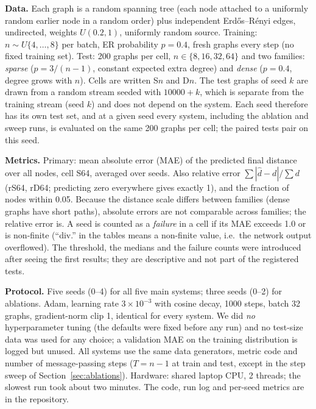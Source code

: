 \textbf{Data.} Each graph is a random spanning tree (each node attached to a uniformly random earlier node in a random order) plus independent Erd\H{o}s--R\'enyi edges, undirected, weights $U(0.2,1)$, uniformly random source. Training: $n\sim U\{4,\dots,8\}$ per batch, ER probability $p=0.4$, fresh graphs every step (no fixed training set). Test: 200 graphs per cell, $n\in\{8,16,32,64\}$ and two families: \emph{sparse} ($p=3/(n-1)$, constant expected extra degree) and \emph{dense} ($p=0.4$, degree grows with $n$). Cells are written S$n$ and D$n$. The test graphs of seed $k$ are drawn from a random stream seeded with $10000+k$, which is separate from the training stream (seed $k$) and does not depend on the system. Each seed therefore has its own test set, and at a given seed every system, including the ablation and sweep runs, is evaluated on the same 200 graphs per cell; the paired tests pair on this seed.

\textbf{Metrics.} Primary: mean absolute error (MAE) of the predicted final distance over all nodes, cell S64, averaged over seeds. Also relative error $\sum|\hat d-d|/\sum d$ (rS64, rD64; predicting zero everywhere gives exactly 1), and the fraction of nodes within 0.05. Because the distance scale differs between families (dense graphs have short paths), absolute errors are not comparable across families; the relative error is. A seed is counted as a \emph{failure} in a cell if its MAE exceeds 1.0 or is non-finite (``div.'' in the tables means a non-finite value, i.e.\ the network output overflowed). The threshold, the medians and the failure counts were introduced after seeing the first results; they are descriptive and not part of the registered tests.

\textbf{Protocol.} Five seeds (0--4) for all five main systems; three seeds (0--2) for ablations. Adam, learning rate $3\times10^{-3}$ with cosine decay, 1000 steps, batch 32 graphs, gradient-norm clip 1, identical for every system. We did \emph{no} hyperparameter tuning (the defaults were fixed before any run) and no test-size data was used for any choice; a validation MAE on the training distribution is logged but unused. All systems use the same data generators, metric code and number of message-passing steps ($T=n-1$ at train and test, except in the step sweep of Section~\ref{sec:ablations}). Hardware: shared laptop CPU, 2 threads; the slowest run took about two minutes. The code, run log and per-seed metrics are in the repository.

